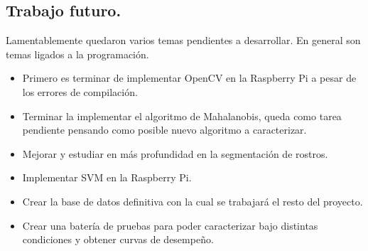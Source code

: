\documentclass[letterpaper,12pt]{article}
\newcommand{\compresslist}{ %
\setlength{\itemsep}{1pt}
\setlength{\parskip}{0pt}
\setlength{\parsep}{0pt}
}
\begin{document}
\subsection{Trabajo futuro.}

Lamentablemente quedaron varios temas pendientes a desarrollar. En general son temas ligados a la programación.
\begin{itemize}\compresslist
\item Primero es terminar de implementar OpenCV en la Raspberry Pi a pesar de los errores de compilación.
\item Terminar la implementar el algoritmo de Mahalanobis, queda como tarea pendiente pensando como posible nuevo algoritmo a caracterizar.
\item Mejorar y estudiar en más profundidad en la segmentación de rostros.
\item Implementar SVM en la Raspberry Pi.
\item Crear la base de datos definitiva con la cual se trabajará el resto del proyecto.
\item Crear una batería de pruebas para poder caracterizar bajo distintas condiciones y obtener curvas de desempeño.
\end{itemize} 



\end{document}
